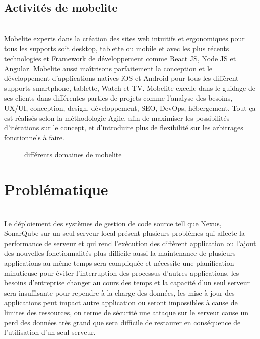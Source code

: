 {\subsection{ Activités de mobelite}
\texttt{}\\[0.5cm]
\textsf{\LARGE Mobelite experts dans la création des sites web intuitifs et ergonomiques pour tous les supports soit desktop, tablette ou mobile et avec les plus récents technologies et Framework de développement comme React JS, Node JS et Angular. Mobelite aussi maîtrisons parfaitement la conception et le développement d’applications natives iOS et Android pour tous les diffèrent supports smartphone, tablette, Watch et TV. Mobelite excelle dans le guidage de ses clients dans différentes parties de projets comme l'analyse des besoins, UX/UI, conception, design, développement, SEO, DevOps, hébergement. Tout ça est réalisés selon la méthodologie Agile, afin de maximiser les possibilités d’itérations sur le concept, et d’introduire plus de flexibilité sur les arbitrages fonctionnels à faire.
}
\begin{figure}
\centering
{}
\caption{différents domaines de mobelite}
\label {fig:Activités de mobilite}
\end{figure}
\newpage
\section{Problématique }
\texttt{}\\[0.5cm]
\textsf{\LARGE
Le déploiement des systèmes de gestion de code source tell que Nexus, SonarQube  sur un seul serveur local présent plusieurs problèmes qui affecte la performance de serveur et qui rend l’exécution des diffèrent application ou l’ajout des nouvelles fonctionnalités plus difficile aussi la maintenance de plusieurs applications au même temps sera compliquée et nécessite une planification minutieuse pour éviter l’interruption des processus d’autres applications, les besoins d’entreprise changer au cours des temps et la capacité d'un seul serveur sera insuffisante pour rependre à la charge des données, les mise à jour des applications peut impact autre application ou seront impossibles à cause de limites des ressources, on terme de sécurité une attaque sur le serveur cause un perd des données très grand que sera difficile de restaurer en conséquence de l’utilisation d'un seul serveur.
}
}
